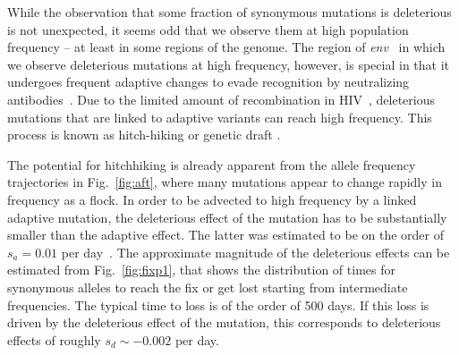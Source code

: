 \documentclass[rmp, twocolumn]{revtex4}
\newcommand{\FIG}[1]{Fig.~\ref{fig:#1}}
\newcommand{\env}{\textit{env}}
\begin{document}
While the observation that some fraction of synonymous mutations is deleterious
is not unexpected, it seems odd that we observe them at high population
frequency -- at least in some regions of the genome. The region of \env~ in
which we observe deleterious mutations at high frequency, however, is special in
that it undergoes frequent adaptive changes to evade recognition by neutralizing
antibodies~\cite{williamson_adaptation_2003,richman_rapid_2003}. Due to the limited amount of
recombination in HIV~\cite{neher_recombination_2010,batorsky_estimate_2011},
deleterious mutations that are linked to adaptive variants can reach high
frequency. This process is known as hitch-hiking \citep{smith_hitch-hiking_1974}
or genetic draft \citep{gillespie_genetic_2000,neher_genetic_2011}.

The potential for hitchhiking is already apparent from the allele frequency
trajectories in \FIG{aft}, where many mutations appear to change rapidly in
frequency as a flock. In order
to be advected to high frequency by a linked adaptive mutation, the deleterious
effect of the mutation has to be substantially smaller than the adaptive effect.
The latter was estimated to be on the order of $s_a = 0.01$ per day~\citep{neher_recombination_2010}.
The approximate magnitude of the deleterious effects can be estimated from
\FIG{fixp1}, that shows the distribution of times for synonymous
alleles to reach the fix or get lost starting from intermediate frequencies. The
typical time to loss is of the order of 500 days. If this loss is driven by the
deleterious effect of the mutation, this corresponds to deleterious effects of
roughly $s_d \sim - 0.002$ per day.
\end{document}
